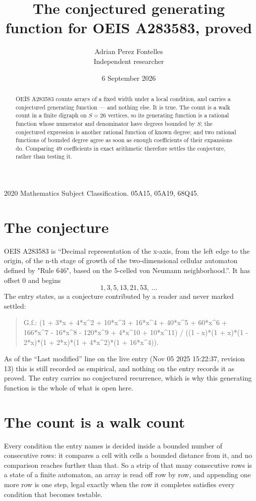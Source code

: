 \documentclass[11pt,a4paper]{article}
\title{The conjectured generating function for OEIS A283583, proved}
\author{Adrian Perez Fontelles\\ \small Independent researcher}
\date{6 September 2026}
\theoremstyle{plain}
\theoremstyle{definition}
\begin{document}
\maketitle

\begin{abstract}
OEIS A283583 counts arrays of a fixed width under a local condition, and carries a conjectured
generating function --- and nothing else. It is true. The count is a walk count in a finite
digraph on $S=26$ vertices, so its generating function is a rational function whose numerator
and denominator have degrees bounded by $S$; the conjectured expression is another rational
function of known degree; and two rational functions of bounded degree agree as soon as enough
coefficients of their expansions do. Comparing $49$ coefficients in exact arithmetic
therefore settles the conjecture, rather than testing it.
\end{abstract}

\noindent\small 2020 Mathematics Subject Classification. 05A15, 05A19, 68Q45.\normalsize

\section{The conjecture}

OEIS A283583 is ``Decimal representation of the x-axis, from the left edge to the origin, of the n-th stage of growth of the two-dimensional cellular automaton defined by "Rule 646", based on the 5-celled von Neumann neighborhood.''. It has offset $0$ and begins
\[
1, 3, 5, 13, 21, 53,\ \dots
\]
The entry states, as a conjecture contributed by a reader and never marked settled:
\begin{quote}
G.f.: (1 + 3*x + 4*x\^{}2 + 10*x\^{}3 + 16*x\^{}4 + 40*x\^{}5 + 60*x\^{}6 + 166*x\^{}7 - 16*x\^{}8 - 120*x\^{}9 + 4*x\^{}10 + 10*x\^{}11) / ((1 - x)*(1 + x)*(1 - 2*x)*(1 + 2*x)*(1 + 4*x\^{}2)*(1 + 16*x\^{}4)).
\end{quote}
As of the ``Last modified'' line on the live entry (Nov 05 2025 15:22:37, revision 13) this is still
recorded as empirical, and nothing on the entry records it as proved. The entry carries no
conjectured recurrence, which is why this generating function is the whole of what is open
here.

\section{The count is a walk count}

Every condition the entry names is decided inside a bounded number of consecutive rows: it
compares a cell with cells a bounded distance from it, and no comparison reaches further than
that. So a strip of that many consecutive rows is a state of a finite automaton, an array is
read off row by row, and appending one more row is one step, legal exactly when the row it
completes satisfies every condition that becomes testable.
\end{document}
